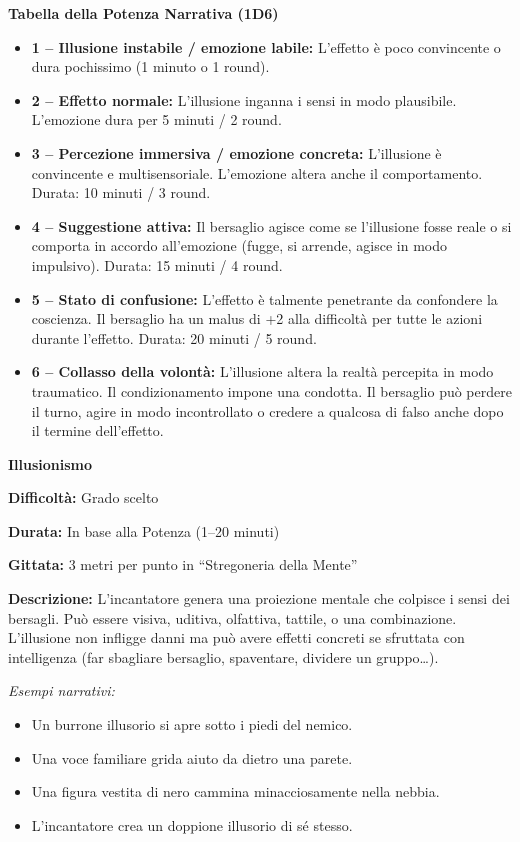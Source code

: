 \documentclass[./magie.tex]{subfiles}
\begin{document}
{\zarafirtitlefont\Large\bfseries\noindent Tabella della Potenza Narrativa (1D6)}
\begin{itemize}
\item \textbf{1 – Illusione instabile / emozione labile:} L’effetto è poco convincente o dura pochissimo (1 minuto o 1 round).
\item \textbf{2 – Effetto normale:} L’illusione inganna i sensi in modo plausibile. L’emozione dura per 5 minuti / 2 round.
\item \textbf{3 – Percezione immersiva / emozione concreta:} L’illusione è convincente e multisensoriale. L’emozione altera anche il comportamento. Durata: 10 minuti / 3 round.
\item \textbf{4 – Suggestione attiva:} Il bersaglio agisce come se l’illusione fosse reale o si comporta in accordo all’emozione (fugge, si arrende, agisce in modo impulsivo). Durata: 15 minuti / 4 round.
\item \textbf{5 – Stato di confusione:} L’effetto è talmente penetrante da confondere la coscienza. Il bersaglio ha un malus di +2 alla difficoltà per tutte le azioni durante l’effetto. Durata: 20 minuti / 5 round.
\item \textbf{6 – Collasso della volontà:} L’illusione altera la realtà percepita in modo traumatico. Il condizionamento impone una condotta. Il bersaglio può perdere il turno, agire in modo incontrollato o credere a qualcosa di falso anche dopo il termine dell’effetto.
\end{itemize}

\clearpage
{\zarafirtitlefont\Large\bfseries\noindent Illusionismo}\\
\begin{description}
\item \textbf{Difficoltà:} Grado scelto
\item \textbf{Durata:} In base alla Potenza (1–20 minuti)
\item \textbf{Gittata:} 3 metri per punto in “Stregoneria della Mente”
\item \textbf{Descrizione:} L’incantatore genera una proiezione mentale che colpisce i sensi dei bersagli. Può essere visiva, uditiva, olfattiva, tattile, o una combinazione. L’illusione non infligge danni ma può avere effetti concreti se sfruttata con intelligenza (far sbagliare bersaglio, spaventare, dividere un gruppo…).
\end{description}

\textit{Esempi narrativi:}
\begin{itemize}
\item Un burrone illusorio si apre sotto i piedi del nemico.
\item Una voce familiare grida aiuto da dietro una parete.
\item Una figura vestita di nero cammina minacciosamente nella nebbia.
\item L’incantatore crea un doppione illusorio di sé stesso.
\end{itemize}
\end{document}
